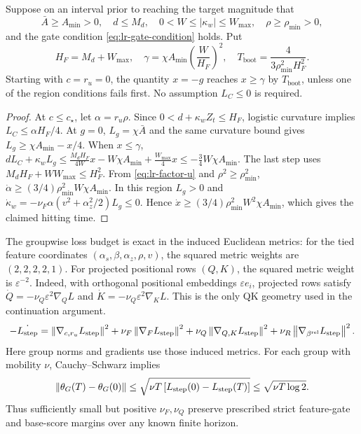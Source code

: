 \begin{lrlemma}
\label{lem:lr-feature-bootstrap}
Suppose on an interval prior to reaching the target magnitude that
\begin{equation}\label{eq:lr-amplification-region}
 \bar A\ge A_{\min}>0,\quad
 d\le M_d,\quad
 0<W\le|\kappa_w|\le W_{\max},\quad
 \rho\ge\rho_{\min}>0,
\end{equation}
and the gate condition \eqref{eq:lr-gate-condition} holds.  Put
\begin{equation}\label{eq:lr-gamma-bootstrap}
 H_F=M_d+W_{\max},\quad
 \gamma=\chi A_{\min}\left(\frac W{H_F}\right)^2,
 \quad
 T_{\mathrm{boot}}=\frac4{3\rho_{\min}^2H_F^2}.
\end{equation}
Starting with $c=r_u=0$, the quantity $x=-g$ reaches $x\ge\gamma$
by $T_{\mathrm{boot}}$, unless one of the region conditions fails first.
No assumption $L_C\le0$ is required.
\end{lrlemma}
\begin{proof}
At $c\le c_\star$, let $\alpha=r_u\rho$.  Since
$0<d+\kappa_w Z_t\le H_F$, logistic curvature implies
$L_C\le\alpha H_F/4$.  At $g=0$, $L_g=\chi\bar A$ and the
same curvature bound gives $L_g\ge\chi A_{\min}-x/4$.
When $x\le\gamma$,
 $dL_C+\kappa_w L_g \le\frac{M_d H_F}{4W}x-W\chi A_{\min} +\frac{W_{\max}}4x \le-\frac34W\chi A_{\min}.$ 
The last step uses
$M_d H_F+WW_{\max}\le H_F^2$.
From \eqref{eq:lr-factor-u} and
$\rho^2\ge\rho_{\min}^2$,
$\dot\alpha\ge(3/4)\rho_{\min}^2W\chi A_{\min}$.
In this region $L_g>0$ and
$\dot \kappa_w=-\nu_F\alpha(v^2+\alpha_z^2/2)L_g\le0$.
Hence $\dot x\ge(3/4)\rho_{\min}^2W^2\chi A_{\min}$,
which gives the claimed hitting time.
\end{proof}

The groupwise loss budget is exact in the induced Euclidean metrics:
for the tied feature coordinates $(\alpha_s,\beta,\alpha_z,\rho,v)$, the squared
metric weights are $(2,2,2,2,1)$. For projected positional rows $(Q,K)$,
the squared metric weight is $\varepsilon^{-2}$.
Indeed, with orthogonal positional embeddings $\varepsilon e_i$,
projected rows satisfy $\dot Q=-\nu_Q\varepsilon^2\nabla_Q L$ and
$\dot K=-\nu_Q\varepsilon^2\nabla_K L$. This is the only QK geometry
used in the continuation argument.
\begin{equation}\label{eq:lr-mobility-budget}
 -\dot{L_{\mathrm{step}}}=
 \left\lVert \nabla_{c,r_u}L_{\mathrm{step}}\right\rVert^2
 +\nu_F\left\lVert \nabla_FL_{\mathrm{step}}\right\rVert^2
 +\nu_Q\left\lVert \nabla_{Q,K}L_{\mathrm{step}}\right\rVert^2
 +\nu_R\left\lVert \nabla_{\beta^{\mathrm{rel}}}L_{\mathrm{step}}\right\rVert^2.
\end{equation}
Here group norms and gradients use those induced metrics. For each group
with mobility $\nu$, Cauchy--Schwarz implies
\begin{equation}\label{eq:lr-movement-budget}
 \left\lVert \theta_G(T)-\theta_G(0)\right\rVert
 \le\sqrt{\nu T\,[L_{\mathrm{step}}(0)-L_{\mathrm{step}}(T)]}
 \le\sqrt{\nu T\log2}.
\end{equation}
Thus sufficiently small but positive $\nu_F,\nu_Q$ preserve prescribed
strict feature-gate and base-score margins over any known finite horizon.


